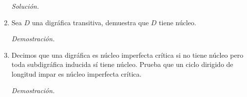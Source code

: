 \documentclass[12pt, fleqn]{article}
\begin{document}
\begin{enumerate}
		\emph{Solución.}

		
		
		\item Sea $D$ una digráfica transitiva, demuestra que $D$ tiene núcleo.
		
		\emph{Demostración.}

		
		
		\item Decimos que una digráfica es núcleo imperfecta crítica si no tiene núcleo pero toda subdigráfica inducida sí tiene núcleo. Prueba que un ciclo dirigido de longitud impar es núcleo imperfecta crítica.
		
		\emph{Demostración.}

		
		
	\end{enumerate}
\end{document}

